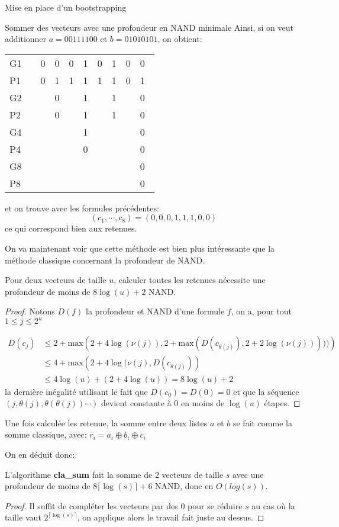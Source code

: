 \begin{section}{Mise en place d'un bootstrapping}
\begin{subsection}{Sommer des vecteurs avec une profondeur en NAND minimale}
Ainsi, si on veut additionner $a = 00111100$ et $b = 01010101$, on obtient:
\begin{center}
\begin{tabular}{llllllllll}
G1 && 0&0&0&1&0&1&0&0 \\
P1 && 0&1&1&1&1&1&0&1 \\
G2 && &0&&1&&1&&0 \\
P2 && &0&&1&&1&&0 \\
G4 && &&&1&&&&0 \\
P4 && &&&0&&&&0 \\
G8 && &&&&&&&0 \\
P8 && &&&&&&&0 \\
\end{tabular}
\end{center}

et on trouve avec les formules précédentes:
\[ (c_1, \cdots, c_8) = (0,0,0,1,1,1,0,0) \]
ce qui correspond bien aux retenues.

On va maintenant voir que cette méthode est bien plus intéressante que la
méthode classique concernant la profondeur de NAND.
\begin{prop}
Pour deux vecteurs de taille $u$, calculer toutes les retenues 
nécessite une profondeur de moins de $8 \log(u) + 2$ NAND.
\end{prop}
\begin{proof}
Notons $D(f)$ la profondeur et NAND d'une formule $f$, on a, pour tout $1 \leq
j \leq 2^u $

\begin{align*}D(c_j) &\leq 2 + \text{max}\left(2 + 4 \log(\nu(j)), 2 +
\text{max}(D(c_{\theta(j)}), 2 + 2 \log(\nu(j)))))\right) \\
&\leq 4 + \text{max}\left(2 + 4 \log(\nu(j), D(c_{\theta(j)})\right) \\
& \leq 4 \log(u) + (2 + 4\log(u)) = 8 \log(u) + 2
\end{align*}
la dernière inégalité utilisant le fait que $D(c_0) = D(0) = 0$ et que 
la séquence $(j, \theta(j), \theta(\theta(j)) \cdots)$ devient constante à 0 en moins de $\log(u)$
étapes.
\end{proof}

Une fois calculée les retenue, la somme entre deux listes $a$ et $b$ se fait
comme la somme classique, avec:
$r_i = a_i \oplus b_i \oplus c_i$

On en déduit donc:

\begin{thm}
L'algorithme \textbf{cla\_sum} fait la somme de $2$ vecteurs de taille $s$ 
avec une profondeur de moins de $8 \lceil \log(s) \rceil + 6$ NAND, donc 
en $O(log(s))$.
\end{thm}
\begin{proof}
Il suffit de compléter les vecteurs par des $0$ pour se réduire $s$ au cas où
la taille vaut $2^{\lceil \log(s) \rceil}$, on applique alors le travail fait juste au dessus.
\end{proof}


\end{subsection}
\end{section}
